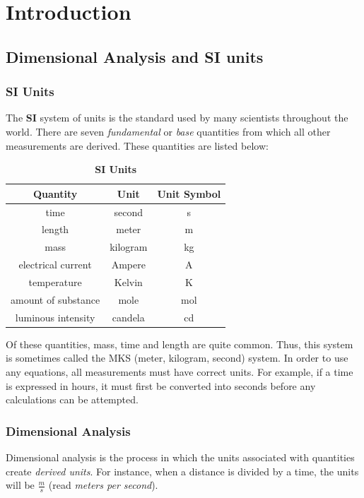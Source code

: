 \chapter{Introduction}
\section{Dimensional Analysis and SI units}
\subsection{SI Units}
The \textbf{SI} system of units is the standard used by many scientists throughout the world.  There are seven \textit{fundamental} or \textit{base} quantities from which all other measurements are derived.  These quantities are listed below:

\begin{center}

	
\begin{table}[ht]\caption{\textbf{SI Units}}%
	\centering %
	\begin{tabular}{|c|c|c|}
		\hline \hline
		\textbf{Quantity} & \textbf{Unit} & \textbf{Unit Symbol}\\
		\hline
		time & second & s \\
		\hline
		length & meter & m \\
		\hline
		mass & kilogram & kg \\
		\hline
		electrical current & Ampere & A \\
		\hline
		temperature & Kelvin & K \\
		\hline
		amount of substance & mole & mol \\
		\hline
		luminous intensity & candela & cd \\
		\hline		
	\end{tabular}
	\label{table:nonlin}%
\end{table}
\end{center}

	Of these quantities, mass, time and length are quite common.  Thus, this system is sometimes called the MKS (meter, kilogram, second) system. In order to use any equations, all measurements must have correct units.  For example, if a time is expressed in hours, it must first be converted into seconds before any calculations can be attempted.  
	
	\subsection{Dimensional Analysis}
	Dimensional analysis  is the process in which the units associated with quantities create \textit{derived units}.  For instance, when a distance is divided by a time, the units will be $ \frac{m}{s}$ (read \textit{meters per second}).  	
	
